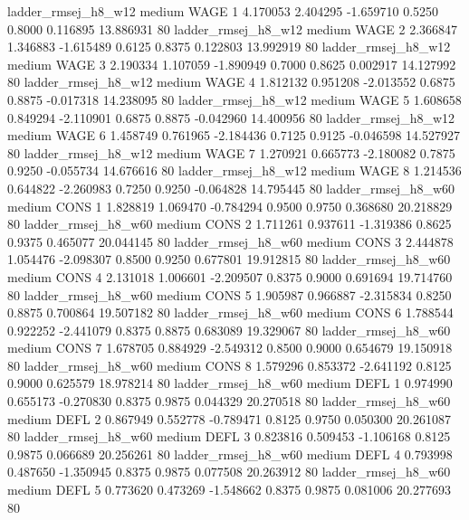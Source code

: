    ladder_rmsej_h8_w12     medium     WAGE                 1  4.170053 2.404295 -1.659710 0.5250 0.8000  0.116895   13.886931 80
   ladder_rmsej_h8_w12     medium     WAGE                 2  2.366847 1.346883 -1.615489 0.6125 0.8375  0.122803   13.992919 80
   ladder_rmsej_h8_w12     medium     WAGE                 3  2.190334 1.107059 -1.890949 0.7000 0.8625  0.002917   14.127992 80
   ladder_rmsej_h8_w12     medium     WAGE                 4  1.812132 0.951208 -2.013552 0.6875 0.8875 -0.017318   14.238095 80
   ladder_rmsej_h8_w12     medium     WAGE                 5  1.608658 0.849294 -2.110901 0.6875 0.8875 -0.042960   14.400956 80
   ladder_rmsej_h8_w12     medium     WAGE                 6  1.458749 0.761965 -2.184436 0.7125 0.9125 -0.046598   14.527927 80
   ladder_rmsej_h8_w12     medium     WAGE                 7  1.270921 0.665773 -2.180082 0.7875 0.9250 -0.055734   14.676616 80
   ladder_rmsej_h8_w12     medium     WAGE                 8  1.214536 0.644822 -2.260983 0.7250 0.9250 -0.064828   14.795445 80
   ladder_rmsej_h8_w60     medium     CONS                 1  1.828819 1.069470 -0.784294 0.9500 0.9750  0.368680   20.218829 80
   ladder_rmsej_h8_w60     medium     CONS                 2  1.711261 0.937611 -1.319386 0.8625 0.9375  0.465077   20.044145 80
   ladder_rmsej_h8_w60     medium     CONS                 3  2.444878 1.054476 -2.098307 0.8500 0.9250  0.677801   19.912815 80
   ladder_rmsej_h8_w60     medium     CONS                 4  2.131018 1.006601 -2.209507 0.8375 0.9000  0.691694   19.714760 80
   ladder_rmsej_h8_w60     medium     CONS                 5  1.905987 0.966887 -2.315834 0.8250 0.8875  0.700864   19.507182 80
   ladder_rmsej_h8_w60     medium     CONS                 6  1.788544 0.922252 -2.441079 0.8375 0.8875  0.683089   19.329067 80
   ladder_rmsej_h8_w60     medium     CONS                 7  1.678705 0.884929 -2.549312 0.8500 0.9000  0.654679   19.150918 80
   ladder_rmsej_h8_w60     medium     CONS                 8  1.579296 0.853372 -2.641192 0.8125 0.9000  0.625579   18.978214 80
   ladder_rmsej_h8_w60     medium     DEFL                 1  0.974990 0.655173 -0.270830 0.8375 0.9875  0.044329   20.270518 80
   ladder_rmsej_h8_w60     medium     DEFL                 2  0.867949 0.552778 -0.789471 0.8125 0.9750  0.050300   20.261087 80
   ladder_rmsej_h8_w60     medium     DEFL                 3  0.823816 0.509453 -1.106168 0.8125 0.9875  0.066689   20.256261 80
   ladder_rmsej_h8_w60     medium     DEFL                 4  0.793998 0.487650 -1.350945 0.8375 0.9875  0.077508   20.263912 80
   ladder_rmsej_h8_w60     medium     DEFL                 5  0.773620 0.473269 -1.548662 0.8375 0.9875  0.081006   20.277693 80

